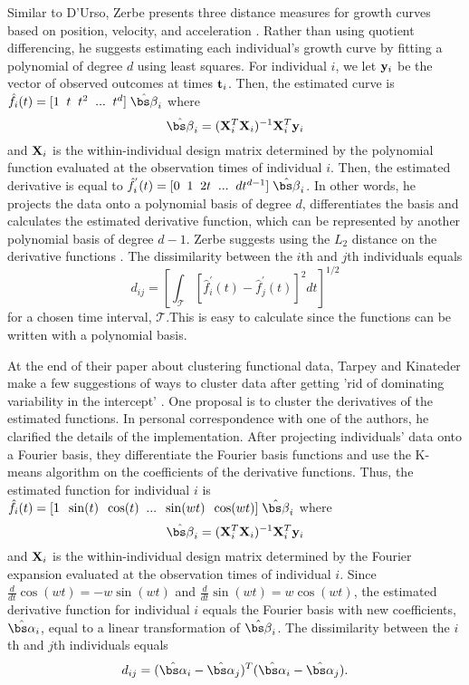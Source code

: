 Similar to D'Urso, Zerbe presents three distance measures for growth curves based on position, velocity, and acceleration \cite{zerbe1979,schneiderman1993}. Rather than using quotient differencing, he suggests estimating each individual's growth curve by fitting a polynomial of degree $d$ using least squares. For individual $i$, we let $\mathbf y_{i}$ be the vector of observed outcomes at times $\mathbf t_{i}$. Then, the estimated curve is $\hat{f}_{i}(t) = [1\;\; t\;\;t^{2}\;\;...\;\;t^{d}]\;\hat{\bs\beta}_{i}$ where 
$$\hat{\bs\beta}_{i} = (\B X^{T}_{i}\B X_{i})^{-1}\B X^{T}_{i}\B y_{i}$$
and $\mathbf X_{i}$ is the within-individual design matrix determined by the polynomial function evaluated at the observation times of individual $i$. Then, the estimated derivative is equal to
$\hat{f}_{i}^{'}(t) = [0\;\; 1\;\;2t\;\;...\;\;dt^{d-1}]\;\hat{\bs\beta}_{i}$. In other words, he projects the data onto a polynomial basis of degree $d$, differentiates the basis and calculates the estimated derivative function, which can be represented by another polynomial basis of degree $d-1$. Zerbe suggests using the $L_{2}$ distance on the derivative functions \cite{schneiderman1993}. The dissimilarity between the $i$th and $j$th individuals equals
$$d_{ij} =\left[ \int_{\mathcal{T}} [\hat{f}^{'}_{i}(t)-\hat{f}^{'}_{j}(t)]^{2}dt\right]^{1/2}$$
for a chosen time interval, $\mathcal{T}$.This is easy to calculate since the functions can be written with a polynomial basis.

At the end of their paper about clustering functional data, Tarpey and Kinateder make a few suggestions of ways to cluster data after getting 'rid of dominating variability in the intercept' \cite{tarpey2003}. One proposal is to cluster the derivatives of the estimated functions. In personal correspondence with one of the authors, he clarified the details of the implementation. After projecting individuals' data onto a Fourier basis, they differentiate the Fourier basis functions and use the K-means algorithm on the coefficients of the derivative functions. Thus, the estimated function for individual $i$ is $\hat{f}_{i}(t)= [1\;\; \sin(t)\;\;\cos(t)\;\;...\;\;\sin(wt)\;\;\cos(wt)]\;\hat{\bs\beta}_{i}$ where
$$\hat{\bs\beta}_{i} = (\B X^{T}_{i}\B X_{i})^{-1}\B X^{T}_{i}\B y_{i}$$
and $\mathbf X_{i}$ is the within-individual design matrix determined by the Fourier expansion evaluated at the observation times of individual $i$. Since $\frac{d}{dt}\cos(wt) = -w\sin(wt)$ and $\frac{d}{dt}\sin(wt) = w\cos(wt)$, the estimated derivative function for individual $i$ equals the Fourier basis with new coefficients, $\hat{\bs\alpha}_{i}$, equal to a linear transformation of $\hat{\bs\beta}_{i}$. The dissimilarity between the $i$th and $j$th individuals equals
$$d_{ij} = (\hat{\bs\alpha}_{i}-\hat{\bs\alpha}_{j})^{T}(\hat{\bs\alpha}_{i}-\hat{\bs\alpha}_{j}).$$

